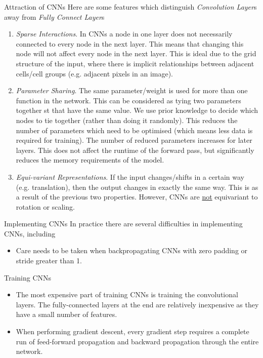\documentclass[11pt,a4paper]{article}
\begin{document}
  \begin{remark}{Attraction of CNNs}
    Here are some features which distinguish \textit{Convolution Layer}s away from \textit{Fully Connect Layer}s
    \begin{enumerate}
      \item \textit{Sparse Interactions}. In CNNs a node in one layer does not necessarily connected to every node in the next layer. This means that changing this node will not affect every node in the next layer. This is ideal due to the grid structure of the input, where there is implicit relationships between adjacent cells/cell groups (e.g. adjacent pixels in an image).
      \item \textit{Parameter Sharing}. The same parameter/weight is used for more than one function in the network. This can be considered as tying two parameters together st that have the same value. We use prior knowledge to decide which nodes to tie together (rather than doing it randomly). This reduces the number of parameters which need to be optimised (which means less data is required for training). The number of reduced parameters increases for later layers. This does not affect the runtime of the forward pass, but significantly reduces the memory requirements of the model. %
      \item \textit{Equi-variant Representations}. If the input changes/shifts in a certain way (e.g. translation), then the output changes in exactly the same way. This is as a result of the previous two properties. However, CNNs are \underline{not} equivariant to rotation or scaling.
    \end{enumerate}
  \end{remark}

  \begin{remark}{Implementing CNNs}
    In practice there are several difficulties in implementing CNNs, including
    \begin{itemize}
      \item Care needs to be taken when backpropagating CNNs with zero padding or stride greater than 1.
    \end{itemize}
  \end{remark}

  \begin{remark}{Training CNNs}
    \begin{itemize}
      \item The most expensive part of training CNNs is training the convolutional layers. The fully-connected layers at the end are relatively inexpensive as they have a small number of features.
      \item When performing gradient descent, every gradient step requires a complete run of feed-forward propagation and backward propagation through the entire network.
    \end{itemize}
  \end{remark}
\end{document}
